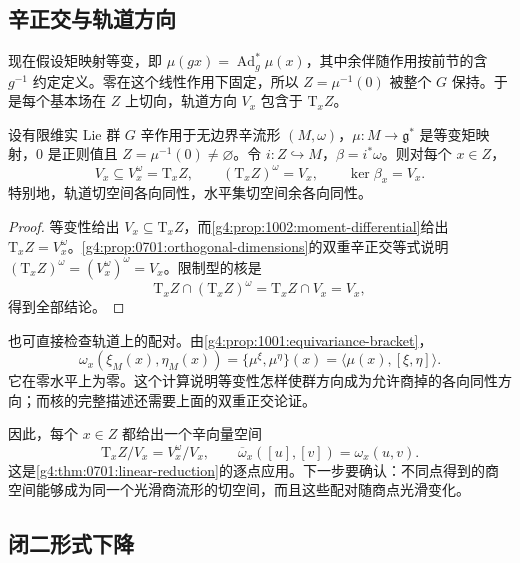 \subsection{辛正交与轨道方向}
\label{g4:subsec:1002:02}

现在假设矩映射等变，即 \(\mu(gx)=\operatorname{Ad}_g^*\mu(x)\)，其中余伴随作用按前节的含 \(g^{-1}\) 约定定义。零在这个线性作用下固定，所以 \(Z=\mu^{-1}(0)\) 被整个 \(G\) 保持。于是每个基本场在 \(Z\) 上切向，轨道方向 \(V_x\) 包含于 \(\mathrm{T}_xZ\)。

\begin{proposition}\label{g4:prop:1002:zero-level-kernel}
	设有限维实 Lie 群 \(G\) 辛作用于无边界辛流形 \((M,\omega)\)，\(\mu:M\to\mathfrak g^*\) 是等变矩映射，\(0\) 是正则值且 \(Z=\mu^{-1}(0)\ne\varnothing\)。令 \(i:Z\hookrightarrow M\)，\(\beta=i^*\omega\)。则对每个 \(x\in Z\)，
	\begin{equation}\label{g4:eq:1002:zero-level-kernel}
		V_x\subseteq V_x^\omega=\mathrm{T}_xZ,
		\qquad
		(\mathrm{T}_xZ)^\omega=V_x,
		\qquad
		\ker\beta_x=V_x.
	\end{equation}
	特别地，轨道切空间各向同性，水平集切空间余各向同性。
\end{proposition}
\begin{proof}
	等变性给出 \(V_x\subseteq\mathrm{T}_xZ\)，而\cref{g4:prop:1002:moment-differential}给出 \(\mathrm{T}_xZ=V_x^\omega\)。\cref{g4:prop:0701:orthogonal-dimensions}的双重辛正交等式说明 \((\mathrm{T}_xZ)^\omega=(V_x^\omega)^\omega=V_x\)。限制型的核是
	\[
		\mathrm{T}_xZ\cap(\mathrm{T}_xZ)^\omega
		=\mathrm{T}_xZ\cap V_x=V_x,
	\]
	得到全部结论。
\end{proof}

也可直接检查轨道上的配对。由\cref{g4:prop:1001:equivariance-bracket}，
\[
	\omega_x(\xi_M(x),\eta_M(x))
	=\{\mu^\xi,\mu^\eta\}(x)
	=\langle\mu(x),[\xi,\eta]\rangle.
\]
它在零水平上为零。这个计算说明等变性怎样使群方向成为允许商掉的各向同性方向；而核的完整描述还需要上面的双重正交论证。

\ProseParagraphBreak

因此，每个 \(x\in Z\) 都给出一个辛向量空间
\[
	\mathrm{T}_xZ/V_x=V_x^\omega/V_x,
	\qquad
	\overline\omega_x([u],[v])=\omega_x(u,v).
\]
这是\cref{g4:thm:0701:linear-reduction}的逐点应用。下一步要确认：不同点得到的商空间能够成为同一个光滑商流形的切空间，而且这些配对随商点光滑变化。

\subsection{闭二形式下降}
\label{g4:subsec:1002:03}

